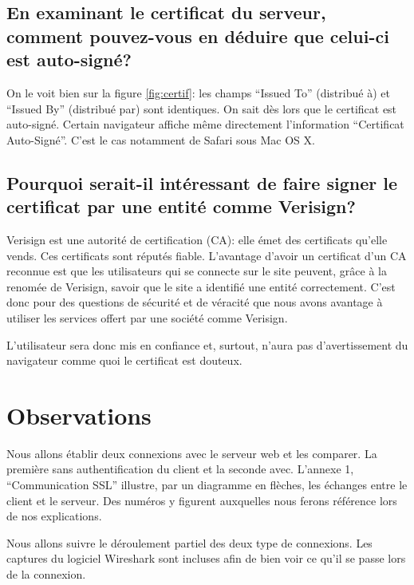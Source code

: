 \documentclass[10pt,a4paper,titlepage]{article}
\begin{document}
\subsection{En examinant le certificat du serveur, comment pouvez-vous en déduire que celui-ci est auto-signé?}

On le voit bien sur la figure \ref{fig:certif}: les champs “Issued To” (distribué à)  et “Issued By” (distribué par) sont identiques. On sait dès lors que le certificat est auto-signé. Certain navigateur affiche même directement l'information “Certificat Auto-Signé”. C'est le cas notamment de Safari sous Mac OS X.

\subsection{Pourquoi serait-il intéressant de faire signer le certificat par une entité comme Verisign?}

Verisign est une autorité de certification (CA): elle émet des certificats qu'elle vends. Ces certificats sont réputés fiable. L'avantage d'avoir un certificat d'un CA reconnue est que les utilisateurs qui se connecte sur le site peuvent, grâce à la renomée de Verisign, savoir que le site a identifié une entité correctement. C'est donc pour des questions de sécurité et de véracité que nous avons avantage à utiliser les services offert par une société comme Verisign.

L'utilisateur sera donc mis en confiance et, surtout, n'aura pas d'avertissement du navigateur comme quoi le certificat est douteux. 

\section{Observations}

Nous allons établir deux connexions avec le serveur web et les comparer. La première sans authentification du client et la seconde avec. L'annexe 1, “Communication SSL” illustre, par un diagramme en flèches, les échanges entre le client et le serveur. Des numéros y figurent auxquelles nous ferons référence lors de nos explications.

Nous allons suivre le déroulement partiel des deux type de connexions. Les captures du logiciel Wireshark sont incluses afin de bien voir ce qu'il se passe lors de la connexion. 
\end{document}
